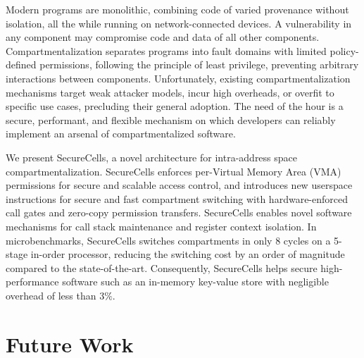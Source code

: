 \documentclass[lablogo]{thesis}
\begin{document}
Modern programs are monolithic, combining code of varied provenance without 
isolation, all the while running on network-connected devices. 
A vulnerability in any component may compromise code and data of all other 
components. 
Compartmentalization separates programs into fault domains with limited 
policy-defined permissions, following the principle of least privilege, 
preventing arbitrary interactions between components. 
Unfortunately, existing compartmentalization mechanisms target weak attacker 
models, incur high overheads, or overfit to specific use cases, precluding 
their general adoption. 
The need of the hour is a secure, performant, and flexible mechanism on which 
developers can reliably implement an arsenal of compartmentalized software. 

We present SecureCells, a novel architecture for intra-address space 
compartmentalization. 
SecureCells enforces per-Virtual Memory Area (VMA) permissions for secure and
scalable access control, and introduces new userspace instructions for 
secure and fast compartment switching with hardware-enforced call gates and 
zero-copy permission transfers. 
SecureCells enables novel software mechanisms for call stack maintenance and 
register context isolation. 
In microbenchmarks, SecureCells switches compartments in only 8 cycles on a 
5-stage in-order processor, reducing the switching cost by an order of magnitude
compared to the state-of-the-art. 
Consequently, SecureCells helps secure high-performance software such as an 
in-memory key-value store with negligible overhead of less than $3\%$.


% 


\chapter{Future Work}
\label{ch:future}

\end{document}

